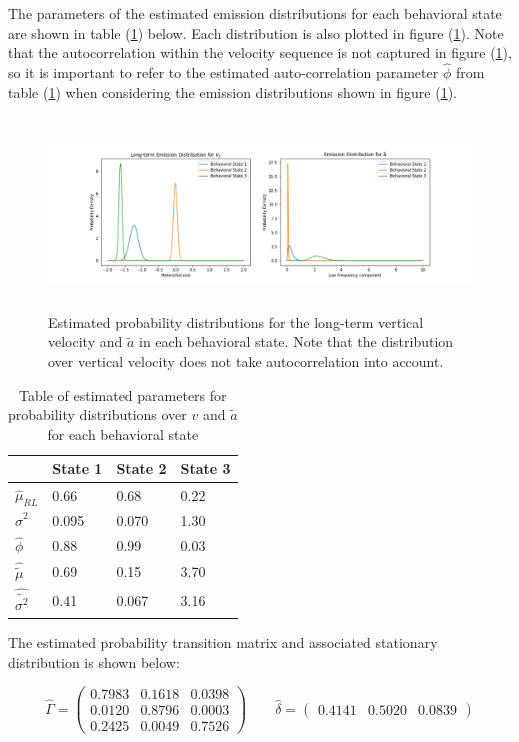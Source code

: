 The parameters of the estimated emission distributions for each behavioral state are shown in table (\ref{table:emis_dist}) below. Each distribution is also plotted in figure (\ref{fig:emis_dist}). Note that the autocorrelation within the velocity sequence is not captured in figure (\ref{fig:emis_dist}), so it is important to refer to the estimated auto-correlation parameter $\hat \phi$ from table (\ref{table:emis_dist}) when considering the emission distributions shown in figure (\ref{fig:emis_dist}).
%
\begin{figure}[h!]
	\centering
	\includegraphics[height=2in]{../Plots/emis_dist.png}
	\caption{Estimated probability distributions for the long-term vertical velocity and $\tilde a$ in each behavioral state. Note that the distribution over vertical velocity does not take autocorrelation into account.}
	\label{fig:emis_dist}
\end{figure}
%
\begin{table}[h!]
	\centering
	\begin{tabular}{l|lll}
		& State 1 & State 2 & State 3 \\ \hline
		$\hat \mu_{RL}$        & 0.66    & 0.68    & 0.22    \\
		$\hat \sigma^2$        & 0.095   & 0.070   & 1.30    \\
		$\hat \phi$            & 0.88    & 0.99    & 0.03    \\ \hline
		$\hat \tilde \mu$      & 0.69    & 0.15    & 3.70    \\
		$\hat \tilde{\sigma^2}$ & 0.41    & 0.067   & 3.16   
	\end{tabular}
	\caption{Table of estimated parameters for probability distributions over $v$ and $\tilde a$ for each behavioral state}
	\label{table:emis_dist}
\end{table}
%
The estimated probability transition matrix and associated stationary distribution is shown below:

$$\hat \Gamma = \begin{pmatrix} 
0.7983 & 0.1618 & 0.0398 \\
0.0120 & 0.8796 & 0.0003 \\
0.2425 & 0.0049 & 0.7526
\end{pmatrix} \qquad \hat \delta = \begin{pmatrix} 0.4141 & 0.5020 & 0.0839 \end{pmatrix}$$


